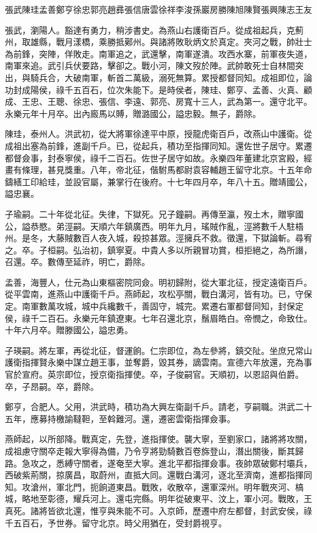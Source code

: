 
\begin{pinyinscope}
張武陳珪孟善鄭亨徐忠郭亮趙彞張信唐雲徐祥李浚孫巖房勝陳旭陳賢張興陳志王友

張武，瀏陽人。豁達有勇力，稍涉書史。為燕山右護衛百戶。從成祖起兵，克薊州，取雄縣，戰月漾橋，乘勝抵鄚州。與諸將敗耿炳文於真定。夾河之戰，帥壯士為前鋒，突陣，佯敗走。南軍追之，武還擊，南軍遂潰。攻西水寨，前軍夜失道，南軍來追。武引兵伏要路，擊卻之。戰小河，陳文歿於陣。武帥敢死士自林間突出，與騎兵合，大破南軍，斬首二萬級，溺死無算。累授都督同知。成祖即位，論功封成陽侯，祿千五百石，位次朱能下。是時侯者，陳珪、鄭亨、孟善、火真、顧成、王忠、王聰、徐忠、張信、李遠、郭亮、房寬十三人，武為第一。還守北平。永樂元年十月卒。出內廄馬以賻，贈潞國公，謚忠毅。無子，爵除。

陳珪，泰州人。洪武初，從大將軍徐達平中原，授龍虎衛百戶，改燕山中護衛。從成祖出塞為前鋒，進副千戶。已，從起兵，積功至指揮同知。還佐世子居守。累遷都督僉事，封泰寧侯，祿千二百石。佐世子居守如故。永樂四年董建北京宮殿，經畫有條理，甚見獎重。八年，帝北征，偕駙馬都尉袁容輔趙王留守北京。十五年命鑄繕工印給珪，並設官屬，兼掌行在後府。十七年四月卒，年八十五。贈靖國公，謚忠襄。

子瑜嗣。二十年從北征。失律，下獄死。兄子鐘嗣。再傳至瀛，歿土木，贈寧國公，謚恭愍。弟涇嗣。天順六年鎮廣西。明年九月，瑤賊作亂，涇將數千人駐梧州。是冬，大藤賊數百人夜入城，殺掠甚眾。涇擁兵不救。徵還，下獄論斬。尋宥之。卒。子桓嗣。弘治初，鎮寧夏。中貴人多以所親冒功賞，桓拒絕之，為所譖，召還。卒。數傳至延祚，明亡，爵除。

孟善，海豐人，仕元為山東樞密院同僉。明初歸附，從大軍北征，授定遠衛百戶。從平雲南，進燕山中護衛千戶。燕師起，攻松亭關，戰白溝河，皆有功。已，守保定。南軍數萬攻城，城中兵纔數千，善固守，城完。累遷右軍都督同知，封保定侯，祿千二百石。永樂元年鎮遼東。七年召還北京，鬚眉皓白。帝憫之，命致仕。十年六月卒。贈滕國公，謚忠勇。

子瑛嗣。將左軍，再從北征，督運餉。仁宗即位，為左參將，鎮交阯。坐庶兄常山護衛指揮賢永樂中謀立趙王事，並奪爵，毀其券，謫雲南。宣德六年放還，充為事官於宣府。英宗即位，授京衛指揮使。卒，子俊嗣官。天順初，以恩詔與伯爵。卒，子昂嗣。卒，爵除。

鄭亨，合肥人。父用，洪武時，積功為大興左衛副千戶。請老，亨嗣職。洪武二十五年，應募持檄諭韃靼，至斡難河。還，遷密雲衛指揮僉事。

燕師起，以所部降。戰真定，先登，進指揮使。襲大寧，至劉家口，諸將將攻關，成祖慮守關卒走報大寧得為備，乃令亨將勁騎數百卷旆登山，潛出關後，斷其歸路。急攻之，悉縛守關者，遂奄至大寧。進北平都指揮僉事。夜帥眾破鄭村壩兵，西破紫荊關，掠廣昌，取蔚州，直抵大同。還戰白溝河，逐北至濟南，進都指揮同知。攻滄州，軍北門，扼餉道東昌。戰敗，收散卒，還軍深州。明年戰夾河、槁城，略地至彰德，耀兵河上。還屯完縣。明年從破東平、汶上，軍小河。戰敗，王真死。諸將皆欲北還，惟亨與朱能不可。入京師，歷遷中府左都督，封武安侯，祿千五百石，予世券。留守北京。時父用猶在，受封爵視亨。


\end{pinyinscope}
